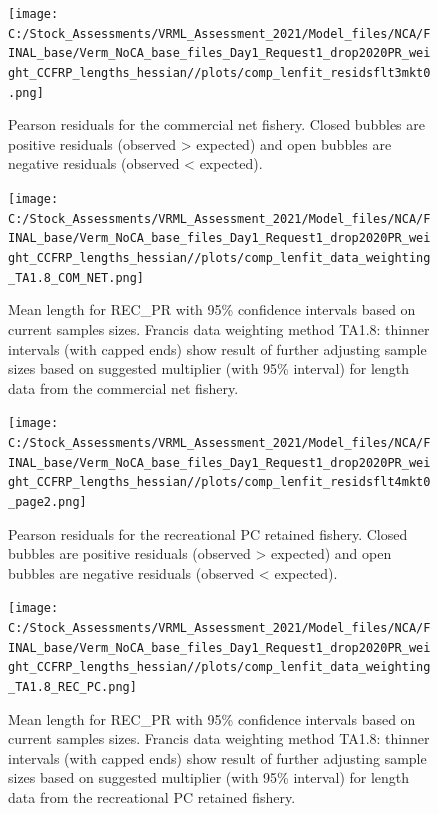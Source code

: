 \documentclass[
  english,
  a4paper,
]{article}
\begin{document}
\begin{figure}
\centering
\texttt{[image: C:/Stock\_Assessments/VRML\_Assessment\_2021/Model\_files/NCA/FINAL\_base/Verm\_NoCA\_base\_files\_Day1\_Request1\_drop2020PR\_weight\_CCFRP\_lengths\_hessian//plots/comp\_lenfit\_residsflt3mkt0.png]}
\caption{Pearson residuals for the commercial net fishery. Closed bubbles are positive residuals (observed \textgreater{} expected) and open bubbles are negative residuals (observed \textless{} expected).\label{fig:len-pearson-COM-NET}}
\end{figure}

\begin{figure}
\centering
\texttt{[image: C:/Stock\_Assessments/VRML\_Assessment\_2021/Model\_files/NCA/FINAL\_base/Verm\_NoCA\_base\_files\_Day1\_Request1\_drop2020PR\_weight\_CCFRP\_lengths\_hessian//plots/comp\_lenfit\_data\_weighting\_TA1.8\_COM\_NET.png]}
\caption{Mean length for REC\_PR with 95\% confidence intervals based on current samples sizes. Francis data weighting method TA1.8: thinner intervals (with capped ends) show result of further adjusting sample sizes based on suggested multiplier (with 95\% interval) for length data from the commercial net fishery.\label{fig:mean-len-fit-COM-NET}}
\end{figure}

\begin{figure}
\centering
\texttt{[image: C:/Stock\_Assessments/VRML\_Assessment\_2021/Model\_files/NCA/FINAL\_base/Verm\_NoCA\_base\_files\_Day1\_Request1\_drop2020PR\_weight\_CCFRP\_lengths\_hessian//plots/comp\_lenfit\_residsflt4mkt0\_page2.png]}
\caption{Pearson residuals for the recreational PC retained fishery. Closed bubbles are positive residuals (observed \textgreater{} expected) and open bubbles are negative residuals (observed \textless{} expected).\label{fig:len-pearson-REC-PC}}
\end{figure}

\begin{figure}
\centering
\texttt{[image: C:/Stock\_Assessments/VRML\_Assessment\_2021/Model\_files/NCA/FINAL\_base/Verm\_NoCA\_base\_files\_Day1\_Request1\_drop2020PR\_weight\_CCFRP\_lengths\_hessian//plots/comp\_lenfit\_data\_weighting\_TA1.8\_REC\_PC.png]}
\caption{Mean length for REC\_PR with 95\% confidence intervals based on current samples sizes. Francis data weighting method TA1.8: thinner intervals (with capped ends) show result of further adjusting sample sizes based on suggested multiplier (with 95\% interval) for length data from the recreational PC retained fishery.\label{fig:mean-len-fit-REC-PC}}
\end{figure}
\end{document}
